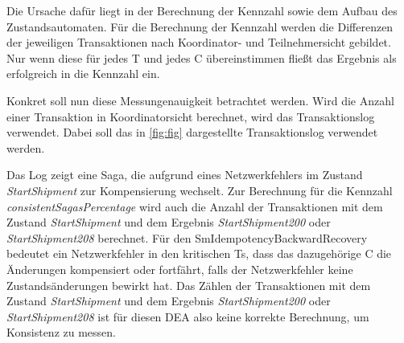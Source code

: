 Die Ursache dafür liegt in der Berechnung der Kennzahl sowie dem Aufbau des Zustandsautomaten. Für die Berechnung der Kennzahl werden die Differenzen der jeweiligen Transaktionen nach Koordinator- und Teilnehmersicht gebildet. Nur wenn diese für jedes T und jedes C übereinstimmen fließt das Ergebnis als erfolgreich in die Kennzahl ein. 

Konkret soll nun diese Messungenauigkeit betrachtet werden. Wird die Anzahl einer Transaktion in Koordinatorsicht berechnet, wird das Transaktionslog verwendet. Dabei soll das in \cref{fig:fig} dargestellte Transaktionslog verwendet werden. 

Das Log zeigt eine Saga, die aufgrund eines Netzwerkfehlers im Zustand \textit{StartShipment} zur Kompensierung wechselt. Zur Berechnung für die Kennzahl \textit{consistentSagasPercentage} wird auch die Anzahl der Transaktionen mit dem Zustand \textit{StartShipment} und dem Ergebnis \textit{StartShipment200} oder \textit{StartShipment208} berechnet. Für den SmIdempotencyBackwardRecovery bedeutet ein Netzwerkfehler in den kritischen Ts, dass das dazugehörige C die Änderungen kompensiert oder fortfährt, falls der Netzwerkfehler keine Zustandsänderungen bewirkt hat. Das Zählen der Transaktionen mit dem Zustand \textit{StartShipment} und dem Ergebnis \textit{StartShipment200} oder \textit{StartShipment208} ist für diesen DEA also keine korrekte Berechnung, um Konsistenz zu messen.


